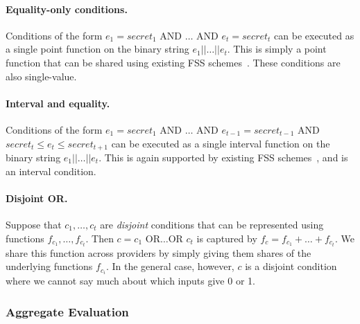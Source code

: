 \paragraph{Equality-only conditions.}
Conditions of the form
$\mathit{e}_1=\mathit{secret}_1$ AND $\dots$ AND
$\mathit{e}_t=\mathit{secret}_t$
can be executed as a single point function on the binary string
$\mathit{e}_1||\dots||\mathit{e}_t$.
This is simply a point function that can be shared using existing
FSS schemes~\cite{fss}.
These conditions are also single-value.

\paragraph{Interval and equality.}
Conditions of the form
$\mathit{e}_1=\mathit{secret}_1$ AND $\dots$ AND
$\mathit{e}_{t-1}=\mathit{secret}_{t-1}$ AND
$\mathit{secret}_{t} \le \mathit{e}_{t} \le \mathit{secret}_{t+1}$
can be executed as a single interval function on the binary string
$\mathit{e}_1||\dots||\mathit{e}_t$.
This is again supported by existing FSS schemes~\cite{fss}, and is
an interval condition.

\paragraph{Disjoint OR.}
Suppose that $c_1,\dots,c_t$ are \emph{disjoint} conditions that can be
represented using functions $f_{c_1}, \dots, f_{c_t}$.
Then $c = c_1$ OR$\dots$OR $c_t$ is captured by
$f_c = f_{c_1} + \dots + f_{c_t}$.
We share this function across providers by simply giving them shares of
the underlying functions $f_{c_i}$.
In the general case, however, $c$ is a disjoint condition where we
cannot say much about which inputs give 0 or 1.


\subsubsection{Aggregate Evaluation}
\label{sec:complex-aggregates}


